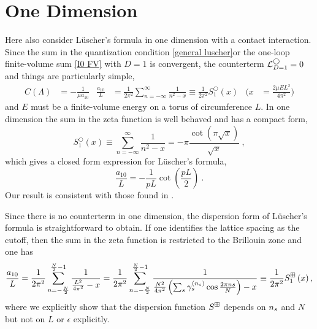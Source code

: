 \section{One Dimension}\label{sec:1D}

Here also consider L\"uscher's formula in one dimension with a contact interaction.
Since the sum in the quantization condition \eqref{general luscher}or the one-loop finite-volume sum \eqref{I0 FV} with $D=1$ is convergent, the counterterm $\mathcal{L}_{D=1}^\bigcirc=0$ and things are particularly simple,
\begin{align}
    C(\Lambda)
        &=
            -\frac{1}{\mu a_{10}}
    &
    \frac{a_{10}}{L}
        &=
            \frac{1}{2 \pi^{2}}
            \sum_{n=-\infty}^{\infty} \frac{1}{n^{2}-x}
        \equiv
            \frac{1}{2 \pi^{2}}
            S^\bigcirc_{1}\left(x\right)
    &
    \Bigg(x
        &=
            \frac{2\mu E L^2}{4\pi^2}\Bigg)
\end{align}
and $E$ must be a finite-volume energy on a torus of circumference $L$.
In one dimension the sum in the zeta function is well behaved and has a compact form,
\begin{equation}
S^\bigcirc_{1}(x) \equiv \sum_{n=-\infty}^{\infty} \frac{1}{n^{2}-x}=-\pi \frac{\cot (\pi \sqrt{x})}{\sqrt{x}}\ ,
\end{equation}
which gives a closed form expression for L\"uscher's formula,
\begin{equation}\label{eq:1d luscher}
\frac{a_{10}}{L} =-\frac{1}{pL}\cot\left(\frac{pL}{2}\right)\ .
\end{equation}
Our result is consistent with those found in \cite{}.

Since there is no counterterm in one dimension, the dispersion form of L\"uscher's formula is straightforward to obtain.  If one identifies the lattice spacing as the cutoff, then the sum in the zeta function is restricted to the Brillouin zone and one has
\begin{equation}
    \frac{a_{10}}{L}
    =
    \frac{1}{2 \pi^{2}} \sum_{n=-\frac{N}{2}}^{\frac{N}{2}-1} \frac{1}{\frac{L^2}{4\pi^2}-x}
    =
    \frac{1}{2 \pi^{2}} \sum_{n=-\frac{N}{2}}^{\frac{N}{2}-1} \frac{1}{\frac{N^2}{4\pi^2}\left(\sum_{s}\gamma_s^{({n_s})}\cos\frac{2\pi n s}{N}\right)-x}
    \equiv
    \frac{1}{2 \pi^{2}} S^{\boxplus}_{1}\left(x\right),\label{eq:1d dispersion}
\end{equation}
where we explicitly show that the dispersion function $S^{\boxplus}$ depends on ${n_s}$ and $N$ but not on $L$ or $\epsilon$ explicitly.


